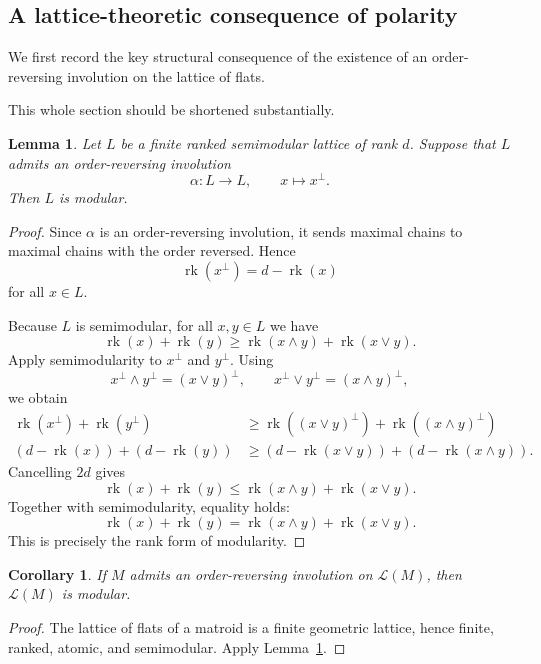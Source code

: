 \documentclass[12pt]{article}
\newcommand{\rk}{\operatorname{rk}}
\newcommand{\cL}{\mathcal L}
\theoremstyle{plain}
\newtheorem{lemma}[theorem]{Lemma}
\newtheorem{corollary}[theorem]{Corollary}
\theoremstyle{definition}
\newcommand{\review}[1]{\begin{reviewbox}#1\end{reviewbox}}
\begin{document}
\subsection{A lattice-theoretic consequence of polarity}

We first record the key structural consequence of the existence of an order-reversing involution on the lattice of flats.

\review{This whole section should be shortened substantially.}

\begin{lemma}\label{lem:selfdual-implies-modular}
Let \(L\) be a finite ranked semimodular lattice of rank \(d\).  Suppose that \(L\) admits an order-reversing involution
\[
   \alpha:L\longrightarrow L,\qquad x\longmapsto x^\perp .
\]
Then \(L\) is modular.
\end{lemma}

\begin{proof}
Since \(\alpha\) is an order-reversing involution, it sends maximal chains to maximal chains with the order reversed.  Hence
\[
   \rk(x^\perp)=d-\rk(x)
\]
for all \(x\in L\).

Because \(L\) is semimodular, for all \(x,y\in L\) we have
\[
   \rk(x)+\rk(y)\ge \rk(x\wedge y)+\rk(x\vee y).
\]
Apply semimodularity to \(x^\perp\) and \(y^\perp\).  Using
\[
   x^\perp\wedge y^\perp=(x\vee y)^\perp,
   \qquad
   x^\perp\vee y^\perp=(x\wedge y)^\perp,
\]
we obtain
\[
\begin{aligned}
  \rk(x^\perp)+\rk(y^\perp)
  &\ge
  \rk((x\vee y)^\perp)+\rk((x\wedge y)^\perp)\\
  (d-\rk(x))+(d-\rk(y))
  &\ge
  (d-\rk(x\vee y))+(d-\rk(x\wedge y)).
\end{aligned}
\]
Cancelling \(2d\) gives
\[
   \rk(x)+\rk(y)\le \rk(x\wedge y)+\rk(x\vee y).
\]
Together with semimodularity, equality holds:
\[
   \rk(x)+\rk(y)=\rk(x\wedge y)+\rk(x\vee y).
\]
This is precisely the rank form of modularity.
\end{proof}

\begin{corollary}\label{cor:M-modular}
If \(M\) admits an order-reversing involution on \(\cL(M)\), then \(\cL(M)\) is modular.
\end{corollary}

\begin{proof}
The lattice of flats of a matroid is a finite geometric lattice, hence finite, ranked, atomic, and semimodular.  Apply Lemma~\ref{lem:selfdual-implies-modular}.
\end{proof}
\end{document}
